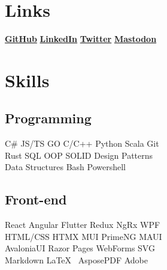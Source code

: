 \documentclass[letterpaper]{cv_12} %
\begin{document}
\begin{minipage}[t]{0.39\textwidth}%


    \section{Links}

    \href{https://github.com/cile-bgd}{\bf GitHub} \textbullet{}
    \href{https://www.linkedin.com/in/sinisa-petkovic-b704034/}{\bf LinkedIn} \textbullet{}
    \href{https://twitter.com/SinisaPetkovic}{\bf Twitter} \textbullet{}
    \href{https://c.im/@foontzoot}{\bf Mastodon}

    \sectionspace%


    \section{Skills}

    \subsection{Programming}

    C\# \textbullet{} JS/TS \textbullet{} GO \textbullet{} C/C++
    \textbullet{} Python \textbullet{} Scala \textbullet{} Git\\
    Rust \textbullet{} SQL \textbullet{} OOP \textbullet{} SOLID
    \textbullet{} Design Patterns\\
    Data Structures \textbullet{} Bash \textbullet{} Powershell

    \sectionspace%

    \subsection{Front-end}

    React \textbullet{} Angular \textbullet{} Flutter \textbullet{} Redux
    \textbullet{} NgRx \textbullet{} WPF\\
    HTML/CSS \textbullet{} HTMX \textbullet{} MUI \textbullet{} PrimeNG
    \textbullet{} MAUI\\
    AvaloniaUI \textbullet{} Razor Pages \textbullet{} WebForms
    \textbullet{} SVG\\
    Markdown \textbullet{} \LaTeX\ \textbullet{} AsposePDF \textbullet{}
    Adobe


\end{minipage}
\end{document}
